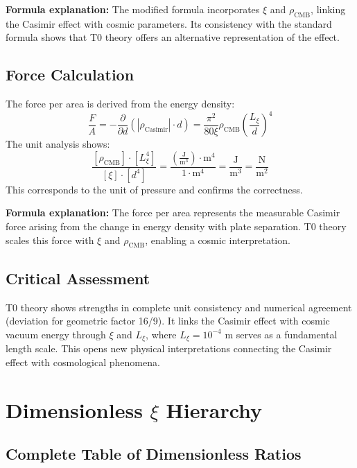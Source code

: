	\textbf{Formula explanation:} The modified formula incorporates $\xi$ and $\rho_{\text{CMB}}$, linking the Casimir effect with cosmic parameters. Its consistency with the standard formula shows that T0 theory offers an alternative representation of the effect.
	
	\subsection{Force Calculation}
	The force per area is derived from the energy density:
	\begin{equation}
		\frac{F}{A} = -\frac{\partial}{\partial d} \left( |\rho_{\text{Casimir}}| \cdot d \right) = \frac{\pi^2}{80 \xi} \rho_{\text{CMB}} \left( \frac{L_\xi}{d} \right)^4
	\end{equation}
	The unit analysis shows:
	\begin{equation}
		\frac{[\rho_{\text{CMB}}] \cdot [L_\xi^4]}{[\xi] \cdot [d^4]} = \frac{\left( \frac{\text{J}}{\text{m}^3} \right) \cdot \text{m}^4}{1 \cdot \text{m}^4} = \frac{\text{J}}{\text{m}^3} = \frac{\text{N}}{\text{m}^2}
	\end{equation}
	This corresponds to the unit of pressure and confirms the correctness.
	
	\textbf{Formula explanation:} The force per area represents the measurable Casimir force arising from the change in energy density with plate separation. T0 theory scales this force with $\xi$ and $\rho_{\text{CMB}}$, enabling a cosmic interpretation.
	
	\subsection{Critical Assessment}
	T0 theory shows strengths in complete unit consistency and numerical agreement (deviation for geometric factor 16/9). It links the Casimir effect with cosmic vacuum energy through $\xi$ and $L_\xi$, where $L_\xi = 10^{-4}$ m serves as a fundamental length scale. This opens new physical interpretations connecting the Casimir effect with cosmological phenomena.
	
	\section{Dimensionless $\xi$ Hierarchy}
	
	\subsection{Complete Table of Dimensionless Ratios}
	
